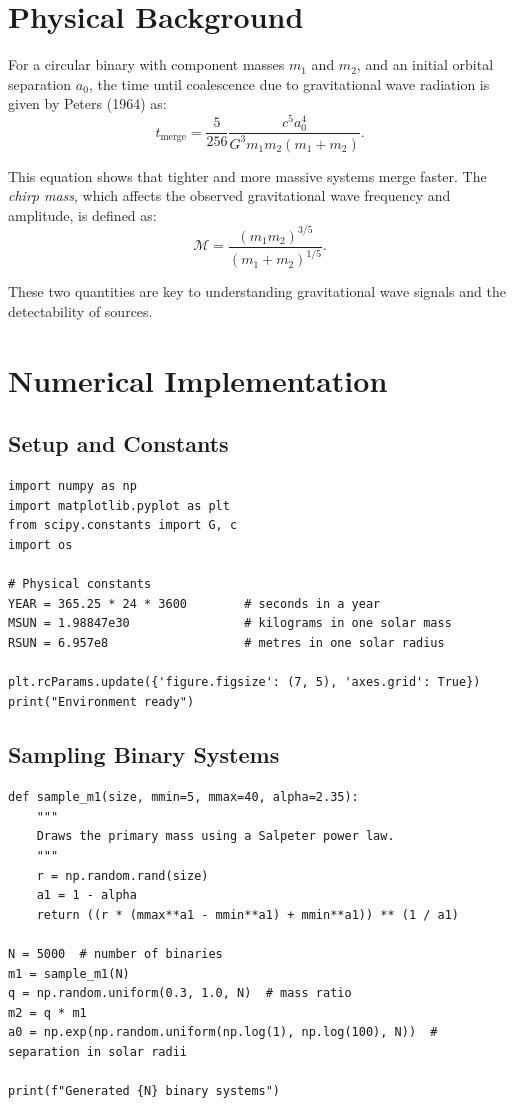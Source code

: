 \documentclass[12pt,a4paper]{article}
\begin{document}
\section{Physical Background}
For a circular binary with component masses $m_1$ and $m_2$, and an initial orbital separation $a_0$, the time until coalescence due to gravitational wave radiation is given by Peters (1964) as:
\begin{equation}
t_{\text{merge}} = \frac{5}{256}\frac{c^5 a_0^4}{G^3 m_1 m_2 (m_1 + m_2)}.
\end{equation}

This equation shows that tighter and more massive systems merge faster.  
The \textit{chirp mass}, which affects the observed gravitational wave frequency and amplitude, is defined as:
\begin{equation}
\mathcal{M} = \frac{(m_1 m_2)^{3/5}}{(m_1 + m_2)^{1/5}}.
\end{equation}

These two quantities are key to understanding gravitational wave signals and the detectability of sources.

\section{Numerical Implementation}

\subsection{Setup and Constants}
\begin{lstlisting}[style=pythonstyle]
import numpy as np
import matplotlib.pyplot as plt
from scipy.constants import G, c
import os

# Physical constants
YEAR = 365.25 * 24 * 3600        # seconds in a year
MSUN = 1.98847e30                # kilograms in one solar mass
RSUN = 6.957e8                   # metres in one solar radius

plt.rcParams.update({'figure.figsize': (7, 5), 'axes.grid': True})
print("Environment ready")
\end{lstlisting}

\subsection{Sampling Binary Systems}
\begin{lstlisting}[style=pythonstyle]
def sample_m1(size, mmin=5, mmax=40, alpha=2.35):
    """
    Draws the primary mass using a Salpeter power law.
    """
    r = np.random.rand(size)
    a1 = 1 - alpha
    return ((r * (mmax**a1 - mmin**a1) + mmin**a1)) ** (1 / a1)

N = 5000  # number of binaries
m1 = sample_m1(N)
q = np.random.uniform(0.3, 1.0, N)  # mass ratio
m2 = q * m1
a0 = np.exp(np.random.uniform(np.log(1), np.log(100), N))  # separation in solar radii

print(f"Generated {N} binary systems")
\end{lstlisting}
\end{document}
